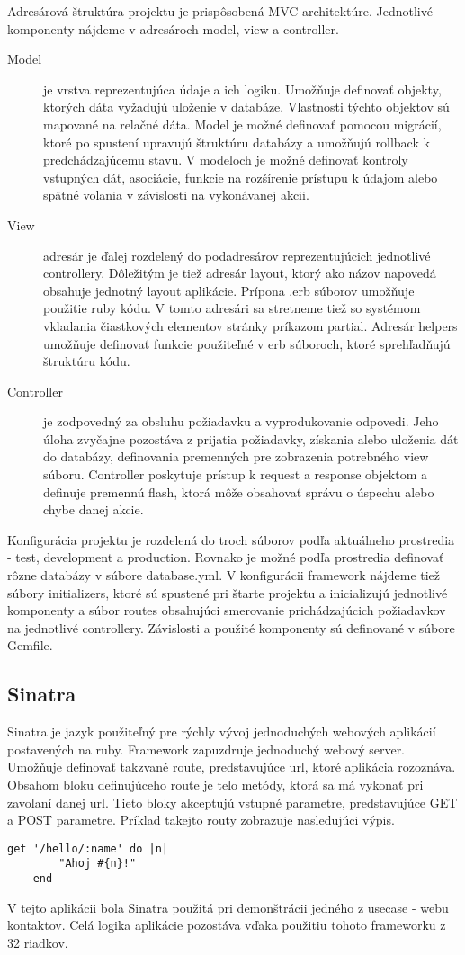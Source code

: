 	Adresárová štruktúra projektu je prispôsobená MVC architektúre. Jednotlivé komponenty nájdeme v adresároch model, view a controller.
	\begin{description}
		\item[Model] je vrstva reprezentujúca údaje a ich logiku. Umožňuje definovať objekty, ktorých dáta vyžadujú uloženie v databáze. Vlastnosti týchto objektov sú mapované na relačné dáta. Model je možné definovať pomocou migrácií, ktoré po spustení upravujú štruktúru databázy a umožňujú rollback k predchádzajúcemu stavu. V modeloch je možné definovať kontroly vstupných dát, asociácie, funkcie na rozšírenie prístupu k údajom alebo spätné volania v závislosti na vykonávanej akcii.
		\item[View] adresár je ďalej rozdelený do podadresárov reprezentujúcich jednotlivé controllery. Dôležitým je tiež adresár layout, ktorý ako názov napovedá obsahuje jednotný layout aplikácie. Prípona .erb súborov umožňuje použitie ruby kódu. V tomto adresári sa stretneme tiež so systémom vkladania čiastkových elementov stránky príkazom partial. Adresár helpers umožňuje definovať funkcie použiteľné v erb súboroch, ktoré sprehľadňujú štruktúru kódu.
		\item[Controller] je zodpovedný za obsluhu požiadavku a vyprodukovanie odpovedi. Jeho úloha zvyčajne pozostáva z prijatia požiadavky, získania alebo uloženia dát do databázy, definovania premenných pre zobrazenia potrebného view súboru. Controller poskytuje prístup k request a response objektom a definuje premennú flash, ktorá môže obsahovať správu o úspechu alebo chybe danej akcie.
	\end{description}
	
	Konfigurácia projektu je rozdelená do troch súborov podľa aktuálneho prostredia - test, development a production. Rovnako je možné podľa prostredia definovať rôzne databázy v súbore database.yml.
	V konfigurácii framework nájdeme tiež súbory initializers, ktoré sú spustené pri štarte projektu a inicializujú jednotlivé komponenty a súbor routes obsahujúci smerovanie prichádzajúcich požiadavkov na jednotlivé controllery. Závislosti a použité komponenty sú definované v súbore Gemfile.
	
	\subsection{Sinatra}
	Sinatra je jazyk použiteľný pre rýchly vývoj jednoduchých webových aplikácií postavených na ruby. Framework zapuzdruje jednoduchý webový server. Umožňuje definovať takzvané route, predstavujúce url, ktoré aplikácia rozoznáva. Obsahom bloku definujúceho route je telo metódy, ktorá sa má vykonať pri zavolaní danej url. Tieto bloky akceptujú vstupné parametre, predstavujúce GET a POST parametre. Príklad takejto routy zobrazuje nasledujúci výpis.
	\begin{lstlisting}[label=lst:sinatra-sampel,caption=Príklad definovania GET route vo frameworku Sinatra]
	get '/hello/:name' do |n|
		"Ahoj #{n}!"
	end
	\end{lstlisting}
	V tejto aplikácii bola Sinatra použitá pri demonštrácii jedného z usecase - webu kontaktov. Celá logika aplikácie pozostáva vďaka použitiu tohoto frameworku z 32 riadkov.

